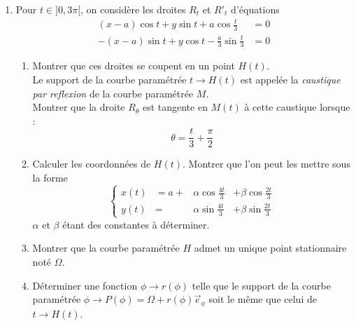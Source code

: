\begin{enumerate}
\item Pour $t\in ]0,3\pi[$, on considère les droites $R_t$ et $R'_t$ d'équations
\begin{align*}
(x-a)\cos t +y \sin t +a\cos \frac{t}{3} &= 0\\
-(x-a)\sin t +y \cos t -\frac{a}{3}\sin \frac{t}{3} &= 0
\end{align*}
\begin{enumerate}
\item Montrer que ces droites se coupent en un point $H(t)$.\\
Le support de la courbe paramétrée $t \rightarrow H(t)$ est appelée la \emph{caustique par reflexion} de la courbe paramétrée $M$.\\
Montrer que la droite $R_\theta$ est tangente en $M(t)$ à cette caustique lorsque :
\begin{displaymath}
 \theta = \frac{t}{3}+\frac{\pi}{2}
\end{displaymath}

\item Calculer les coordonnées de $H(t)$. Montrer que l'on peut les mettre sous la forme
\begin{displaymath}
\left\lbrace
   \begin{aligned}
x(t) & = a +& \alpha \cos \frac{4t}{3}  &+  \beta \cos \frac{2t}{3} \\
y(t) & =    & \alpha \sin \frac{4t}{3}  &+  \beta \sin \frac{2t}{3}
   \end{aligned}
\right. 
\end{displaymath}
$\alpha$ et $\beta$ étant des constantes à déterminer.
\item Montrer que la courbe paramétrée $H$ admet un unique point stationnaire noté $\Omega$.
\item Déterminer une fonction $\phi \rightarrow r(\phi)$ telle que le support de la courbe paramétrée $\phi \rightarrow P(\phi)=\Omega +r(\phi)\overrightarrow{e}_\phi$ soit le même que celui de $t \rightarrow H(t)$.
\end{enumerate}
\end{enumerate} 
